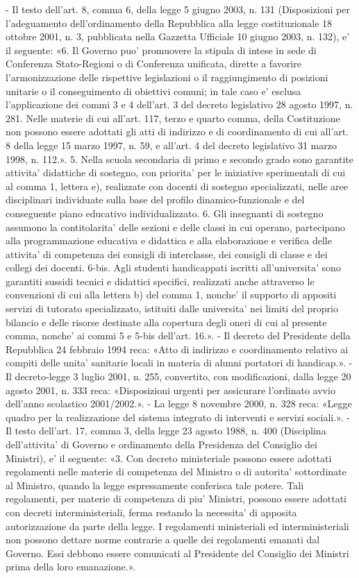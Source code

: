     - Il testo dell'art. 8, comma 6, della legge 5 giugno 2003, n. 131 (Disposizioni per l'adeguamento dell'ordinamento della Repubblica alla legge costituzionale 18 ottobre 2001, n. 3, pubblicata nella Gazzetta Ufficiale 10 giugno 2003, n. 132), e' il seguente: «6. Il Governo puo' promuovere la stipula di intese in sede di Conferenza Stato-Regioni o di Conferenza unificata, dirette a favorire l'armonizzazione delle rispettive legislazioni o il raggiungimento di posizioni unitarie o il conseguimento di obiettivi comuni; in tale caso e' esclusa l'applicazione dei commi 3 e 4 dell'art. 3 del decreto legislativo 28 agosto 1997, n. 281. Nelle materie di cui all'art. 117, terzo e quarto comma, della Costituzione non possono essere adottati gli atti di indirizzo e di coordinamento di cui all'art. 8 della legge 15 marzo 1997, n. 59, e all'art. 4 del decreto legislativo 31 marzo 1998, n. 112.». 5. Nella scuola secondaria di primo e secondo grado sono garantite attivita' didattiche di sostegno, con priorita' per le iniziative sperimentali di cui al comma 1, lettera e), realizzate con docenti di sostegno specializzati, nelle aree disciplinari individuate sulla base del profilo dinamico-funzionale e del conseguente piano educativo individualizzato. 6. Gli insegnanti di sostegno assumono la contitolarita' delle sezioni e delle classi in cui operano, partecipano alla programmazione educativa e didattica e alla elaborazione e verifica delle attivita' di competenza dei consigli di interclasse, dei consigli di classe e dei collegi dei docenti. 6-bis. Agli studenti handicappati iscritti all'universita' sono garantiti sussidi tecnici e didattici specifici, realizzati anche attraverso le convenzioni di cui alla lettera b) del comma 1, nonche' il supporto di appositi servizi di tutorato specializzato, istituiti dalle universita' nei limiti del proprio bilancio e delle risorse destinate alla copertura degli oneri di cui al presente
    comma, nonche' ai commi 5 e 5-bis dell'art. 16.».
    - Il decreto del Presidente della Repubblica 24 febbraio 1994 reca: «Atto di indirizzo e coordinamento relativo ai compiti delle unita' sanitarie locali in materia di alunni portatori di handicap.».
    - Il decreto-legge 3 luglio 2001, n. 255, convertito, con modificazioni, dalla legge 20 agosto 2001, n. 333 reca: «Disposizioni urgenti per assicurare l'ordinato avvio dell'anno scolastico 2001/2002.».
    - La legge 8 novembre 2000, n. 328 reca: «Legge quadro per la realizzazione del sistema integrato di interventi e servizi sociali.».
    - Il testo dell'art. 17, comma 3, della legge 23 agosto 1988, n. 400 (Disciplina dell'attivita' di Governo e ordinamento della Presidenza del Consiglio dei Ministri), e' il seguente: «3. Con decreto ministeriale possono essere adottati regolamenti nelle materie di competenza del Ministro o di autorita' sottordinate al Ministro, quando la legge espressamente conferisca tale potere. Tali regolamenti, per materie di competenza di piu' Ministri, possono essere adottati con decreti interministeriali, ferma restando la necessita' di apposita autorizzazione da parte della legge. I regolamenti ministeriali ed interministeriali non possono dettare norme contrarie a quelle dei regolamenti emanati dal Governo. Essi debbono essere comunicati al Presidente del Consiglio dei Ministri prima della loro emanazione.».
